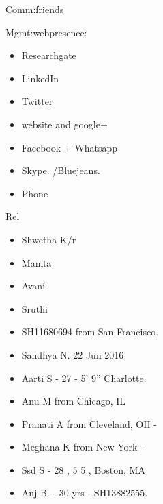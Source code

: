 \documentclass[serif, mathserif, final]{beamer}
\begin{document}
\begin{frame}
\begin{columns}
\begin{column}{0.25\linewidth}
\begin{block}{Comm:friends}
\begin{itemize}
\end{itemize} 
\end{block} 

\begin{block}{Mgmt:webpresence:}
\begin{itemize} 
\tiny \item \tiny Researchgate 
\item \tiny LinkedIn 
\item \tiny Twitter 
\item \tiny website and google+ 
\item \tiny Facebook + Whatsapp
\item \tiny Skype. /Bluejeans. 
\item \tiny Phone
\end{itemize}
\end{block} 


\begin{block}{Rel} 
  \begin{itemize} 
  \small \item \small Shwetha K/r
    \item \small Mamta
    \item \small Avani 
    \item \small Sruthi 
    \item \small SH11680694 from San Francisco. 
    \item \small Sandhya N. 22 Jun 2016 
    \item \small Aarti S - 27 - 5' 9'' Charlotte.       
    \item \small Anu M from Chicago, IL 
    \item \small Pranati A from Cleveland, OH - 
    \item \small Meghana K from New York - 
    \item \small Ssd S - 28 , 5 5 , Boston, MA 
    \item \small Anj B. - 30 yrs - SH13882555.
  \end{itemize}
\end{block} 

\end{column}%
\end{columns}
\end{frame}
\end{document}
